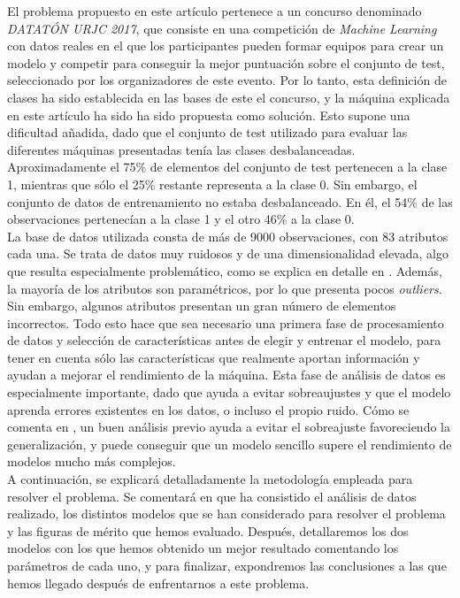 \documentclass[journal,twoside]{JoPhA}
\begin{document}
	
El problema propuesto en este artículo pertenece a un concurso denominado \emph{DATATÓN URJC 2017}, que consiste en una competición de \textit{Machine Learning} con datos reales en el que los participantes pueden formar equipos para crear un modelo y competir para conseguir la mejor puntuación sobre el conjunto de test, seleccionado por los organizadores de este evento. Por lo tanto, esta definición de clases ha sido establecida en las bases de este el concurso, y la máquina explicada en este artículo ha sido ha sido propuesta como solución. Esto supone una dificultad añadida, dado que el conjunto de test utilizado para evaluar las diferentes máquinas presentadas tenía las clases desbalanceadas. Aproximadamente el 75\% de elementos del conjunto de test pertenecen a la clase 1, mientras que sólo el 25\% restante representa a la clase 0. Sin embargo, el conjunto de datos de entrenamiento no estaba desbalanceado. En él, el 54\% de las observaciones pertenecían a la clase 1 y el otro 46\% a la clase 0. \\
	
La base de datos utilizada consta de más de 9000 observaciones, con 83 atributos cada una. Se trata de datos muy ruidosos y de una dimensionalidad elevada, algo que resulta especialmente problemático, como se explica en detalle en \cite{alta_dimensionalidad}. Además, la mayoría de los atributos son paramétricos, por lo que presenta pocos \textit{outliers}. Sin embargo, algunos atributos presentan un gran número de elementos incorrectos. Todo esto hace que sea necesario una primera fase de procesamiento de datos y selección de características antes de elegir y entrenar el modelo, para tener en cuenta sólo las características que realmente aportan información y ayudan a mejorar el rendimiento de la máquina. Esta fase de análisis de datos es especialmente importante, dado que ayuda a evitar sobreaujustes y que el modelo aprenda errores existentes en los datos, o incluso el propio ruido. Cómo se comenta en \cite{extraccion_datos}, un buen análisis previo ayuda a evitar el sobreajuste favoreciendo la generalización, y puede conseguir que un modelo sencillo supere el rendimiento de modelos mucho más complejos. \\
	
A continuación, se explicará detalladamente la metodología empleada para resolver el problema. Se comentará en que ha consistido el análisis de datos realizado, los distintos modelos que se han considerado para resolver el problema y las figuras de mérito que hemos evaluado. Después, detallaremos los dos modelos con los que hemos obtenido un mejor resultado comentando los parámetros de cada uno, y para finalizar, expondremos las conclusiones a las que hemos llegado después de enfrentarnos a este problema. \\
\end{document}

